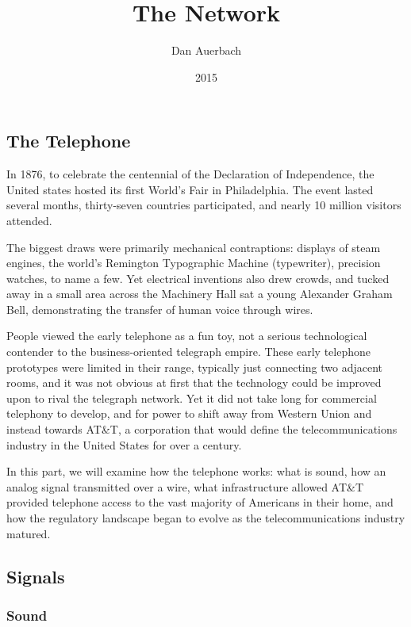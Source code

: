 \documentclass[UTF8]{book}
\begin{document}
\begin{CJK}{UTF8}{gbsn}

\title{The Network}
\author{Dan Auerbach}
\date{2015}
\maketitle

\part{The Telephone}

In 1876, to celebrate the centennial of the Declaration of Independence, the United states hosted its first World's Fair in Philadelphia. The event lasted several months, thirty-seven countries participated, and nearly 10 million visitors attended.

The biggest draws were primarily mechanical contraptions: displays of steam engines, the world's Remington Typographic Machine (typewriter), precision watches, to name a few. Yet electrical inventions also drew crowds, and tucked away in a small area across the Machinery Hall sat a young Alexander Graham Bell, demonstrating the transfer of human voice through wires.

People viewed the early telephone as a fun toy, not a serious technological contender to the business-oriented telegraph empire. These early telephone prototypes were limited in their range, typically just connecting two adjacent rooms, and it was not obvious at first that the technology could be improved upon to rival the telegraph network. Yet it did not take long for commercial telephony to develop, and for power to shift away from Western Union and instead towards AT\&T, a corporation that would define the telecommunications industry in the United States for over a century.

In this part, we will examine how the telephone works: what is sound, how an analog signal transmitted over a wire, what infrastructure allowed AT\&T provided telephone access to the vast majority of Americans in their home, and how the regulatory landscape began to evolve as the telecommunications industry matured.

\chapter{Signals}

\section{Sound}


\end{CJK}
\end{document}
